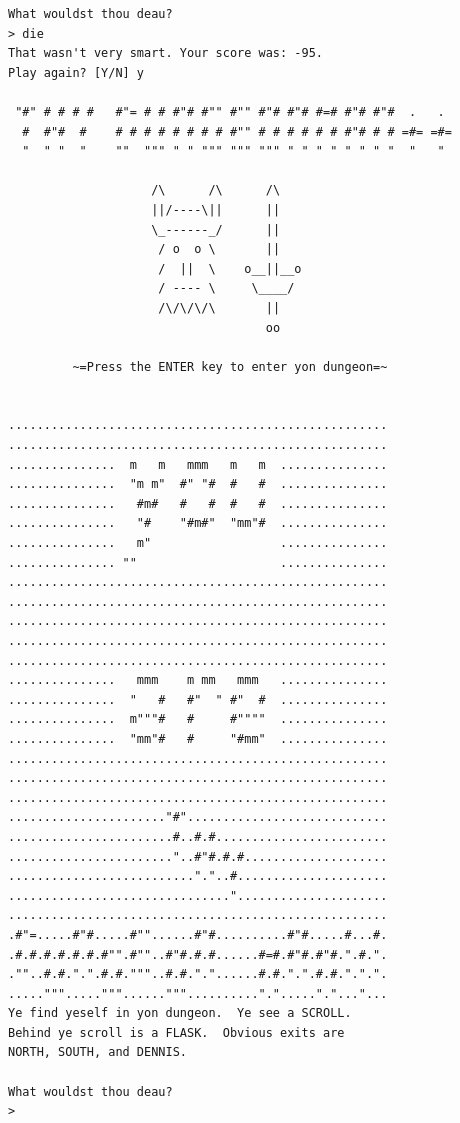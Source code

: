 \documentclass[man,12pt]{apa6}
\begin{document}
\begin{singlespace}
\begin{framed}
\begin{verbatim}What wouldst thou deau?
> die
That wasn't very smart. Your score was: -95.
Play again? [Y/N] y

 "#" # # # #   #"= # # #"# #"" #"" #"# #"# #=# #"# #"#  .   .
  #  #"#  #    # # # # # # # # #"" # # # # # # #"# # # =#= =#=
  "  " "  "    ""  """ " " """ """ """ " " " " " " " "  "   "

                    /\      /\      /\
                    ||/----\||      ||
                    \_------_/      ||
                     / o  o \       ||
                     /  ||  \    o__||__o
                     / ---- \     \____/
                     /\/\/\/\       ||
                                    oo

         ~=Press the ENTER key to enter yon dungeon=~


.....................................................
.....................................................
...............  m   m   mmm   m   m  ...............
...............  "m m"  #" "#  #   #  ...............
...............   #m#   #   #  #   #  ...............
...............   "#    "#m#"  "mm"#  ...............
...............   m"                  ...............
............... ""                    ...............
.....................................................
.....................................................
.....................................................
.....................................................
.....................................................
...............   mmm    m mm   mmm   ...............
...............  "   #   #"  " #"  #  ...............
...............  m"""#   #     #""""  ...............
...............  "mm"#   #     "#mm"  ...............
.....................................................
.....................................................
.....................................................
......................"#"............................
.......................#..#.#........................
......................."..#"#.#.#....................
.........................."."..#.....................
...............................".....................
.....................................................
.#"=.....#"#.....#""......#"#..........#"#.....#...#.
.#.#.#.#.#.#.#"".#""..#"#.#.#......#=#.#"#.#"#.".#.".
.""..#.#.".".#.#."""..#.#."."......#.#.".".#.#.".".".
....."""....."""......""".........."."....."."..."...
Ye find yeself in yon dungeon.  Ye see a SCROLL.
Behind ye scroll is a FLASK.  Obvious exits are
NORTH, SOUTH, and DENNIS.

What wouldst thou deau?
> 
\end{verbatim}
\end{framed}
\end{singlespace}
\end{document}
